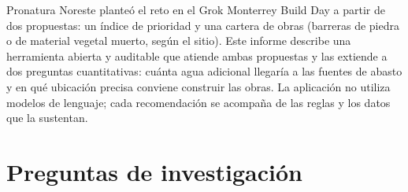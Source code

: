 Pronatura Noreste planteó el reto en el Grok Monterrey Build Day a partir de dos propuestas: un índice de prioridad y una cartera de obras (barreras de piedra o de material vegetal muerto, según el sitio). Este informe describe una herramienta abierta y auditable que atiende ambas propuestas y las extiende a dos preguntas cuantitativas: cuánta agua adicional llegaría a las fuentes de abasto y en qué ubicación precisa conviene construir las obras. La aplicación no utiliza modelos de lenguaje; cada recomendación se acompaña de las reglas y los datos que la sustentan.


\section{Preguntas de investigación}

